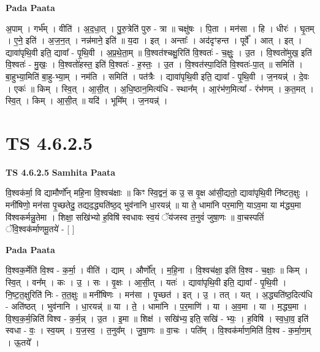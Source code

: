 \documentclass[17pt]{extarticle}
\begin{document}
\textbf{Pada Paata} \newline

अ॒पाम् । गर्भ᳚म् । वीति॑ । अ॒द॒धा॒त् । पु॒रु॒त्रेति॑ पुरु - त्रा ॥ चक्षु॑षः । पि॒ता । मन॑सा । हि । धीरः॑ । घृ॒तम् । ए॒ने॒ इति॑ । अ॒ज॒न॒त् । नन्न॑माने॒ इति॑ ॥ य॒दा । इत् । अन्ताः᳚ । अद॑दृꣳहन्त । पूर्वे᳚ । आत् । इत् । द्यावा॑पृथि॒वी इति॒ द्यावा᳚ - पृ॒थि॒वी । अ॒प्र॒थे॒ता॒म् ॥ वि॒श्वत॑श्चक्षु॒रिति॑ वि॒श्वतः॑ - च॒क्षुः॒ । उ॒त । वि॒श्वतो॑मुख॒ इति॑ वि॒श्वतः॑ - मु॒खः॒ । वि॒श्वतो॑हस्त॒ इति॑ वि॒श्वतः॑ - ह॒स्तः॒ । उ॒त । वि॒श्वत॑स्पा॒दिति॑ वि॒श्वतः॑-पा॒त् ॥ समिति॑ । बा॒हुभ्या॒मिति॑ बा॒हु-भ्या॒म् । नम॑ति । समिति॑ । पत॑त्रैः । द्यावा॑पृथि॒वी इति॒ द्यावा᳚ - पृ॒थि॒वी । ज॒नयन्न्॑ । दे॒वः । एकः॑ ॥ किम् । स्वि॒त् । आ॒सी॒त् । अ॒धि॒ष्ठान॒मित्य॑धि - स्थान᳚म् । आ॒रंभ॑ण॒मित्या᳚ - रंभ॑णम् । क॒त॒मत् । स्वि॒त् । किम् । आ॒सी॒त् ॥ यदि॑ । भूमि᳚म् । ज॒नयन्न्॑ ।  \newline




\section*{ TS 4.6.2.5 }

\textbf{TS 4.6.2.5 } \newline
\textbf{Samhita Paata} \newline

वि॒श्वक॑र्मा॒ वि द्यामौर्णो᳚न् महि॒ना वि॒श्वच॑क्षाः ॥ किꣳ स्वि॒द्वनं॒ क उ॒ स वृ॒क्ष आ॑सी॒द्यतो॒ द्यावा॑पृथि॒वी नि॑ष्टत॒क्षुः । मनी॑षिणो॒ मन॑सा पृ॒च्छतेदु॒ तद्यद॒द्ध्यति॑ष्ठ॒द् भुव॑नानि धा॒रयन्न्॑ ॥ या ते॒ धामा॑नि पर॒माणि॒ याऽव॒मा या म॑द्ध्य॒मा वि॑श्वकर्मन्नु॒तेमा । शिक्षा॒ सखि॑भ्यो ह॒विषि॑ स्वधावः स्व॒यं ॅय॑जस्व त॒नुवं॑ जुषा॒णः ॥ वा॒चस्पतिं॑ ॅवि॒श्वक॑र्माणमू॒तये॑ - [  ] \newline

\textbf{Pada Paata} \newline

वि॒श्वक॒र्मेति॑ वि॒श्व - क॒र्मा॒ । वीति॑ । द्याम् । और्णो᳚त् । म॒हि॒ना । वि॒श्वच॑क्षा॒ इति॑ वि॒श्व - च॒क्षाः॒ ॥ किम् । स्वि॒त् । वन᳚म् । कः । उ॒ । सः । वृ॒क्षः । आ॒सी॒त् । यतः॑ । द्यावा॑पृथि॒वी इति॒ द्यावा᳚ - पृ॒थि॒वी । नि॒ष्ट॒त॒क्षुरिति॑ निः - त॒त॒क्षुः ॥ मनी॑षिणः । मन॑सा । पृ॒च्छत॑ । इत् । उ॒ । तत् । यत् । अ॒द्ध्यति॑ष्ठ॒दित्य॑धि - अति॑ष्ठत् । भुव॑नानि । धा॒रयन्न्॑ ॥ या । ते॒ । धामा॑नि । प॒र॒माणि॑ । या । अ॒व॒मा । या । म॒द्ध्य॒मा । वि॒श्व॒क॒र्म॒न्निति॑ विश्व - क॒र्म॒न्न् । उ॒त । इ॒मा ॥ शिक्ष॑ । सखि॑भ्य॒ इति॒ सखि॑ - भ्यः॒ । ह॒विषि॑ । स्व॒धा॒व॒ इति॑ स्वधा - वः॒ । स्व॒यम् । य॒ज॒स्व॒ । त॒नुव᳚म् । जु॒षा॒णः ॥ वा॒चः । पति᳚म् । वि॒श्वक॑र्माण॒मिति॑ वि॒श्व - क॒र्मा॒ण॒म् । ऊ॒तये᳚ ।  \newline
\end{document}
